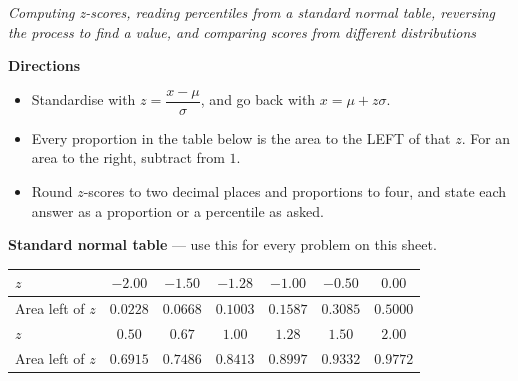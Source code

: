 \documentclass[12pt]{article}
\begin{document}

\begin{center}
\textit{Computing z-scores, reading percentiles from a standard normal table, reversing the process to find a value, and comparing scores from different distributions}
\end{center}

\vspace{0.15cm}
\noindent\textbf{Directions}
\begin{itemize}[leftmargin=0.7cm, itemsep=1pt, topsep=2pt]
  \item Standardise with $z = \dfrac{x - \mu}{\sigma}$, and go back with $x = \mu + z\sigma$.
  \item Every proportion in the table below is the area to the LEFT of that $z$. For an area to the right, subtract from $1$.
  \item Round $z$-scores to two decimal places and proportions to four, and state each answer as a proportion or a percentile as asked.
\end{itemize}

\vspace{0.15cm}
\noindent\textbf{Standard normal table} --- use this for every problem on this sheet.
\par\vspace{0.1cm}
\begin{center}
\small
\begin{tabular}{|l|c|c|c|c|c|c|}
\hline
$z$ & $-2.00$ & $-1.50$ & $-1.28$ & $-1.00$ & $-0.50$ & $0.00$ \\ \hline
Area left of $z$ & $0.0228$ & $0.0668$ & $0.1003$ & $0.1587$ & $0.3085$ & $0.5000$ \\ \hline
$z$ & $0.50$ & $0.67$ & $1.00$ & $1.28$ & $1.50$ & $2.00$ \\ \hline
Area left of $z$ & $0.6915$ & $0.7486$ & $0.8413$ & $0.8997$ & $0.9332$ & $0.9772$ \\ \hline
\end{tabular}
\end{center}

\vspace{0.2cm}


\end{document}
